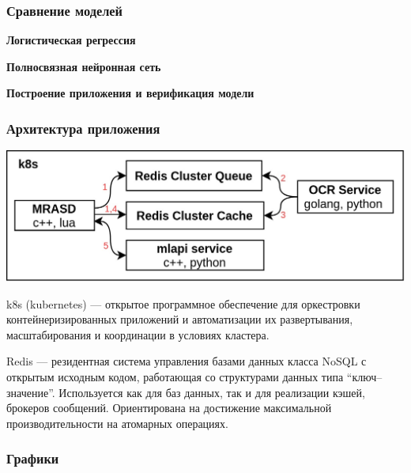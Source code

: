 \documentclass[compress,professionalfont]{beamer}
\begin{document}
\begin{frame}
\frametitle{Сравнение моделей}

\textbf{Логистическая регрессия}

\vspace{.5cm}

\textbf{Полносвязная нейронная сеть}

\end{frame}

\begin{frame}

\begin{center}
\Huge\bf Построение приложения и верификация модели
\end{center}

\end{frame}

\begin{frame}
\frametitle{Архитектура приложения}

\begin{center}
\includegraphics[width=.8\textwidth]{architecture.jpg}
\end{center}

k8s (kubernetes) --- открытое программное обеспечение для оркестровки контейнеризированных приложений и автоматизации их развертывания, масштабирования и координации в условиях кластера.

Redis --- резидентная система управления базами данных класса NoSQL с открытым исходным кодом, работающая со структурами данных типа ``ключ--значение''. Используется как для баз данных, так и для реализации кэшей, брокеров сообщений. Ориентирована на достижение максимальной производительности на атомарных операциях.

\end{frame}

\begin{frame}
\frametitle{Графики}

\end{frame}
\end{document}
